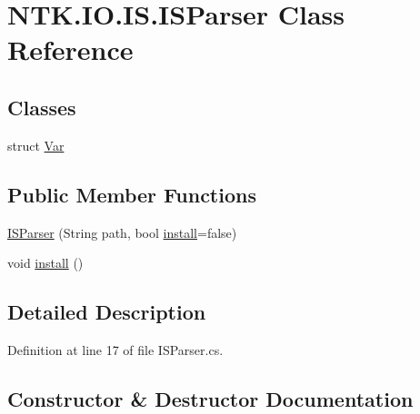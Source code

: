 \hypertarget{class_n_t_k_1_1_i_o_1_1_i_s_1_1_i_s_parser}{}\section{N\+T\+K.\+I\+O.\+I\+S.\+I\+S\+Parser Class Reference}
\label{class_n_t_k_1_1_i_o_1_1_i_s_1_1_i_s_parser}


 


\subsection*{Classes}
\begin{DoxyCompactItemize}
\item 
struct \mbox{\hyperlink{struct_n_t_k_1_1_i_o_1_1_i_s_1_1_i_s_parser_1_1_var}{Var}}
\end{DoxyCompactItemize}
\subsection*{Public Member Functions}
\begin{DoxyCompactItemize}
\item 
\mbox{\hyperlink{class_n_t_k_1_1_i_o_1_1_i_s_1_1_i_s_parser_a6302ed3ea852d0c79a3645c7d3a31f7e}{I\+S\+Parser}} (String path, bool \mbox{\hyperlink{class_n_t_k_1_1_i_o_1_1_i_s_1_1_i_s_parser_aec037e7d4edd8cd7bf83111a59ab5e2a}{install}}=false)
\item 
void \mbox{\hyperlink{class_n_t_k_1_1_i_o_1_1_i_s_1_1_i_s_parser_aec037e7d4edd8cd7bf83111a59ab5e2a}{install}} ()
\end{DoxyCompactItemize}


\subsection{Detailed Description}




Definition at line 17 of file I\+S\+Parser.\+cs.



\subsection{Constructor \& Destructor Documentation}
\mbox{\label{class_n_t_k_1_1_i_o_1_1_i_s_1_1_i_s_parser_a6302ed3ea852d0c79a3645c7d3a31f7e}} 

